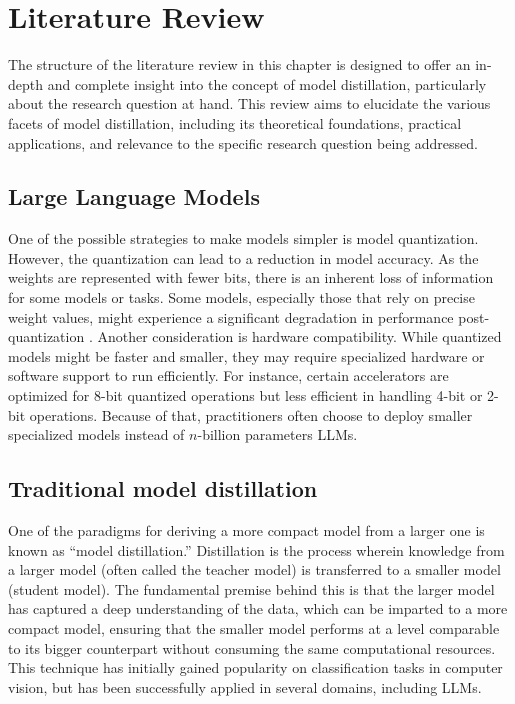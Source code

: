 \chapter{Literature Review}
\label{chap:lr}

The structure of the literature review in this chapter is designed to offer an in-depth and complete insight into the concept of model distillation, particularly about the research question at hand. This review aims to elucidate the various facets of model distillation, including its theoretical foundations, practical applications, and relevance to the specific research question being addressed.

\section{Large Language Models}

One of the possible strategies to make models simpler is model quantization. However, the quantization can lead to a reduction in model accuracy. As the weights are represented with fewer bits, there is an inherent loss of information for some models or tasks. Some models, especially those that rely on precise weight values, might experience a significant degradation in performance post-quantization \cite{compressingllm}. Another consideration is hardware compatibility. While quantized models might be faster and smaller, they may require specialized hardware or software support to run efficiently. For instance, certain accelerators are optimized for 8-bit quantized operations but less efficient in handling 4-bit or 2-bit operations. Because of that, practitioners often choose to deploy smaller specialized models instead of \(n\)-billion parameters LLMs.

\section{Traditional model distillation}

One of the paradigms for deriving a more compact model from a larger one is known as ``model distillation.'' Distillation is the process wherein knowledge from a larger model (often called the teacher model) is transferred to a smaller model (student model). The fundamental premise behind this is that the larger model has captured a deep understanding of the data, which can be imparted to a more compact model, ensuring that the smaller model performs at a level comparable to its bigger counterpart without consuming the same computational resources. This technique has initially gained popularity on classification tasks in computer vision, but has been successfully applied in several domains, including LLMs.

